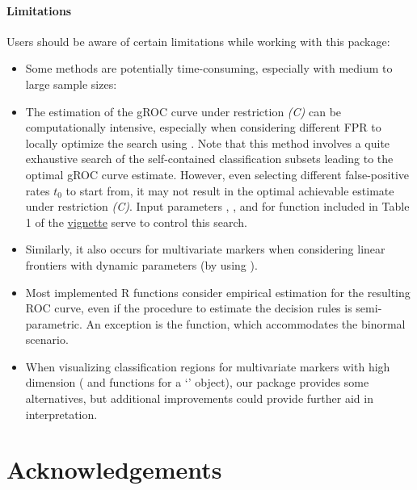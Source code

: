 \paragraph{Limitations}

Users should be aware of certain limitations while working with this package:
\begin{itemize}
\item Some methods are potentially time-consuming, especially with medium to large sample sizes:

\item[] The estimation of the gROC curve under restriction \textit{(C)} can be computationally intensive, especially when considering different FPR to locally optimize the search using . Note that this method involves a quite exhaustive search of the self-contained classification subsets leading to the optimal gROC curve estimate. However, even selecting different false-positive rates $t_0$ to start from, it may not result in the optimal achievable estimate under restriction \textit{(C)}. Input parameters , ,  and  for  function included in Table 1 of the \href{https://cran.r-project.org/web/packages/movieROC/vignettes/movieROC_vignette.pdf}{vignette} serve to control this search.

\item[] Similarly, it also occurs for multivariate markers when considering linear frontiers with dynamic parameters (by using ).
\item Most implemented R functions consider empirical estimation for the resulting ROC curve, even if the procedure to estimate the decision rules is semi-parametric. An exception is the  function, which accommodates the binormal scenario.
\item When visualizing  classification regions for multivariate markers with high dimension \linebreak ( and  functions for a `' object), our package provides some alternatives, but additional improvements could provide further aid in interpretation.
\end{itemize}



\section*{Acknowledgements}


